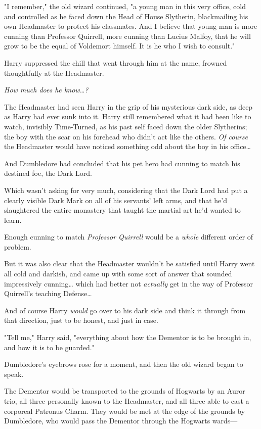 "I remember," the old wizard continued, "a young man in this very office, cold
and controlled as he faced down the Head of House Slytherin, blackmailing his
own Headmaster to protect his classmates. And I believe that young man is more
cunning than Professor Quirrell, more cunning than Lucius Malfoy, that he will
grow to be the equal of Voldemort himself. It is he who I wish to consult."

Harry suppressed the chill that went through him at the name, frowned
thoughtfully at the Headmaster.

\emph{How much does he know{\ldots}?}

The Headmaster had seen Harry in the grip of his mysterious dark side, as deep
as Harry had ever sunk into it. Harry still remembered what it had been like to
watch, invisibly Time-Turned, as his past self faced down the older Slytherins;
the boy with the scar on his forehead who didn't act like the others. \emph{Of
course} the Headmaster would have noticed something odd about the boy in his
office{\ldots}

And Dumbledore had concluded that his pet hero had cunning to match his
destined foe, the Dark Lord.

Which wasn't asking for very much, considering that the Dark Lord had put a
clearly visible Dark Mark on all of his servants' left arms, and that he'd
slaughtered the entire monastery that taught the martial art he'd wanted to
learn.

Enough cunning to match \emph{Professor Quirrell} would be a \emph{whole}
different order of problem.

But it was also clear that the Headmaster wouldn't be satisfied until Harry
went all cold and darkish, and came up with some sort of answer that sounded
impressively cunning{\ldots} which had better not \emph{actually} get in the
way of Professor Quirrell's teaching Defense{\ldots}

And of course Harry \emph{would} go over to his dark side and think it through
from that direction, just to be honest, and just in case.

"Tell me," Harry said, "everything about how the Dementor is to be brought in,
and how it is to be guarded."

Dumbledore's eyebrows rose for a moment, and then the old wizard began to speak.

The Dementor would be transported to the grounds of Hogwarts by an Auror trio,
all three personally known to the Headmaster, and all three able to cast a
corporeal Patronus Charm. They would be met at the edge of the grounds by
Dumbledore, who would pass the Dementor through the Hogwarts wards---

